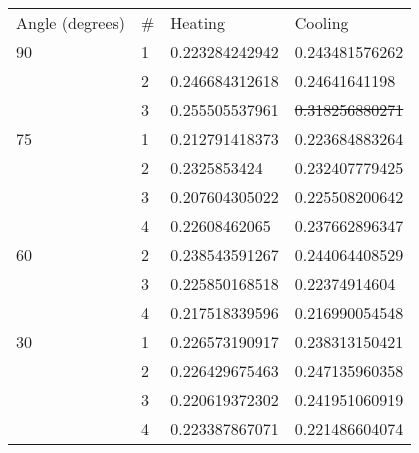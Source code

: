 \begin{tabular}{l l | l l}
Angle (degrees) & \# & Heating & Cooling\\
90 & 1 & 0.223284242942 & 0.243481576262\\
& 2 & 0.246684312618 & 0.24641641198\\
& 3 & 0.255505537961 & \sout{0.318256880271}\\
75 & 1 & 0.212791418373 & 0.223684883264\\
& 2 & 0.2325853424 & 0.232407779425\\
& 3 & 0.207604305022 & 0.225508200642\\
& 4 & 0.22608462065 & 0.237662896347\\
60 & 2 & 0.238543591267 & 0.244064408529\\
& 3 & 0.225850168518 & 0.22374914604\\
& 4 & 0.217518339596 & 0.216990054548\\
30 & 1 & 0.226573190917 & 0.238313150421\\
& 2 & 0.226429675463 & 0.247135960358\\
& 3 & 0.220619372302 & 0.241951060919\\
& 4 & 0.223387867071 & 0.221486604074\\
\end{tabular}
